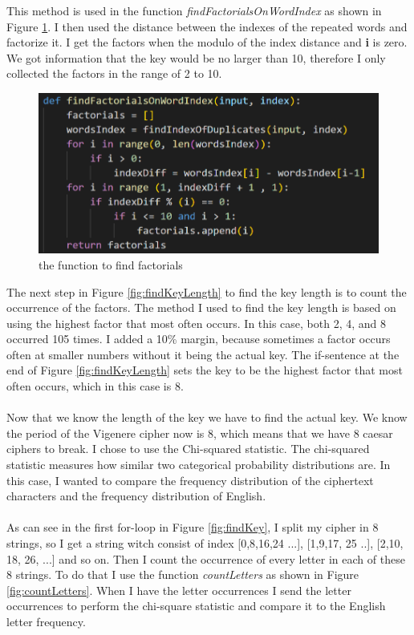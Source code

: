 \documentclass[12pt, letterpaper]{article}
\begin{document}
This method is used in the function \textit{findFactorialsOnWordIndex} as shown in Figure \ref{fig:findFactorialsOnWordIndex}. I then used the distance between the indexes of the repeated words and factorize it. I get the factors when the modulo of the index distance and \textbf{i} is zero. We got information that the key would be no larger than 10, therefore I only collected the factors in the range of 2 to 10.

\begin{figure}[H]
  \includegraphics[width=\linewidth]{code_snippets/findFactorialsOnWordIndex.PNG}
  \caption{the function to find factorials}
  \label{fig:findFactorialsOnWordIndex}
\end{figure}

The next step in Figure \ref{fig:findKeyLength} to find the key length is to count the occurrence of the factors. The method I used to find the key length is based on using the highest factor that most often occurs. In this case, both 2, 4, and 8 occurred 105 times. I added a 10\% margin, because sometimes a factor occurs often at smaller numbers without it being the actual key. The if-sentence at the end of Figure \ref{fig:findKeyLength} sets the key to be the highest factor that most often occurs, which in this case is 8.
\\ \\
Now that we know the length of the key we have to find the actual key. We know the period of the Vigenere cipher now is 8, which means that we have 8 caesar ciphers to break. I chose to use the Chi-squared statistic. The chi-squared statistic measures how similar two categorical probability distributions are. In this case, I wanted to compare the frequency distribution of the ciphertext characters and the frequency distribution of English.
\\ \\
As can see in the first for-loop in Figure \ref{fig:findKey}, I split my cipher in 8 strings, so I get a string witch consist of index [0,8,16,24 ...], [1,9,17, 25 ..], [2,10, 18, 26, ...] and so on. Then I count the occurrence of every letter in each of these 8 strings. To do that I use the function \textit{countLetters} as shown in Figure \ref{fig:countLetters}. When I have the letter occurrences I send the letter occurrences to perform the chi-square statistic and compare it to the English letter frequency.
\end{document}
